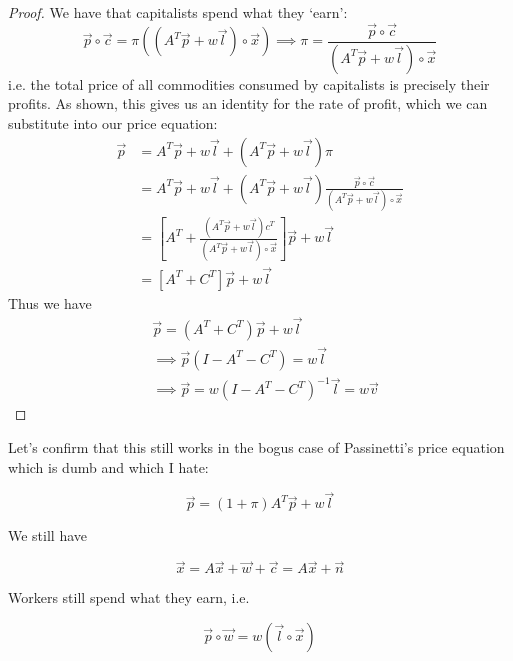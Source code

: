 \documentclass{article}
\theoremstyle{definition}
\newtheorem{theorem}{theorem}[section]
\begin{document}
\begin{proof}
    We have that capitalists spend what they `earn': 
    \[ \vec{p} \circ \vec{c} = \pi\left((A^T\vec{p}+w\vec{l})\circ \vec{x}\right) \implies \pi = \frac{\vec{p}\circ\vec{c}}{(A^T\vec{p}+w\vec{l})\circ\vec{x}} \]
    i.e. the total price of all commodities consumed by capitalists is precisely their profits. As shown, this gives us an identity for the rate of profit, which we can substitute into our price equation:
    \begin{align}
        \vec{p} &= A^T\vec{p}+w\vec{l}+(A^T\vec{p}+w\vec{l})\pi \\
                &= A^T\vec{p}+w\vec{l}+(A^T\vec{p}+w\vec{l}) \frac{\vec{p}\circ\vec{c}}{(A^T\vec{p}+w\vec{l})\circ\vec{x}} \\
                &= \left[ A^T+ \frac{(A^T\vec{p}+w\vec{l})c^T}{(A^T\vec{p}+w\vec{l})\circ \vec{x}} \right]\vec{p} + w\vec{l} \\
                &= \left[ A^T+C^T \right] \vec{p} + w\vec{l}
    \end{align}
    Thus we have
    \begin{align}
        & \vec{p} = (A^T+C^T)\vec{p}+w\vec{l} \\
        &\implies \vec{p}(I-A^T-C^T) = w\vec{l} \\
        &\implies \vec{p} = w(I-A^T-C^T)^{-1}\vec{l} = w\vec{v}
\end{align}
\end{proof}

Let's confirm that this still works in the bogus case of Passinetti's price equation which is dumb and which I hate:

\begin{equation}\label{garbage}
    \vec{p} = (1+\pi)A^T\vec{p}+w\vec{l}
\end{equation}

We still have 

\begin{equation}
    \vec{x} = A\vec{x}+\vec{w}+\vec{c} = A\vec{x}+\vec{n}
\end{equation}

Workers still spend what they earn, i.e. 

\[ \vec{p}\circ \vec{w} = w(\vec{l}\circ\vec{x}) \]
\end{document}
